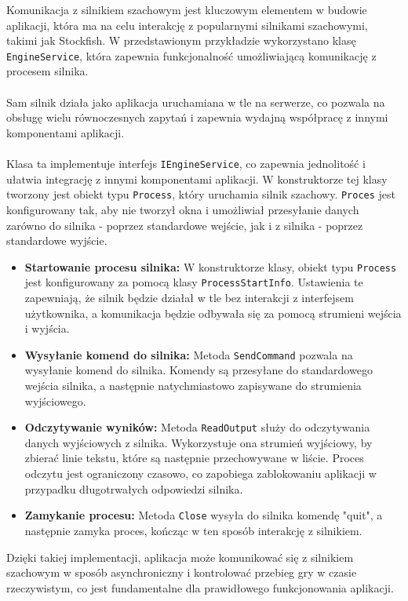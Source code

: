 \documentclass[12pt,a4paper]{article}
\begin{document}
\newpage

\noindent
Komunikacja z silnikiem szachowym jest kluczowym elementem w budowie aplikacji, która ma na celu interakcję z popularnymi silnikami szachowymi, takimi jak Stockfish. W przedstawionym przykładzie wykorzystano klasę \texttt{EngineService}, która zapewnia funkcjonalność umożliwiającą komunikację z procesem silnika.
\\\\
Sam silnik działa jako aplikacja uruchamiana w tle na serwerze, co pozwala na obsługę wielu równoczesnych zapytań i zapewnia wydajną współpracę z innymi komponentami aplikacji.
\\\\
Klasa ta implementuje interfejs \texttt{IEngineService}, co zapewnia jednolitość i ułatwia integrację z innymi komponentami aplikacji. W konstruktorze tej klasy tworzony jest obiekt typu \texttt{Process}, który uruchamia silnik szachowy. \texttt{Proces} jest konfigurowany tak, aby nie tworzył okna i umożliwiał przesyłanie danych zarówno do silnika - poprzez standardowe wejście, jak i z silnika - poprzez standardowe wyjście.

\begin{itemize} 
    \item \textbf{Startowanie procesu silnika:} W konstruktorze klasy, obiekt typu \texttt{Process} jest konfigurowany za pomocą klasy \texttt{ProcessStartInfo}. Ustawienia te zapewniają, że silnik będzie działał w tle bez interakcji z interfejsem użytkownika, a komunikacja będzie odbywała się za pomocą strumieni wejścia i wyjścia. 
    \item \textbf{Wysyłanie komend do silnika:} Metoda \texttt{SendCommand} pozwala na wysyłanie komend do silnika. Komendy są przesyłane do standardowego wejścia silnika, a następnie natychmiastowo zapisywane do strumienia wyjściowego. 
    \item \textbf{Odczytywanie wyników:} Metoda \texttt{ReadOutput} służy do odczytywania danych wyjściowych z silnika. Wykorzystuje ona strumień wyjściowy, by zbierać linie tekstu, które są następnie przechowywane w liście. Proces odczytu jest ograniczony czasowo, co zapobiega zablokowaniu aplikacji w przypadku długotrwałych odpowiedzi silnika. 
    \item \textbf{Zamykanie procesu:} Metoda \texttt{Close} wysyła do silnika komendę "quit", a następnie zamyka proces, kończąc w ten sposób interakcję z silnikiem. 
\end{itemize}

\noindent
Dzięki takiej implementacji, aplikacja może komunikować się z silnikiem szachowym w sposób asynchroniczny i kontrolować przebieg gry w czasie rzeczywistym, co jest fundamentalne dla prawidłowego funkcjonowania aplikacji.
\\\\
\end{document}
